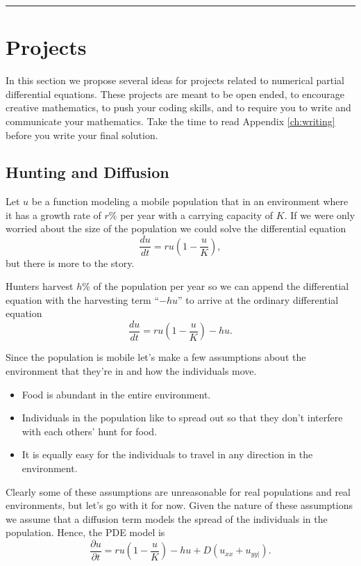 \documentclass[
]{book}
\theoremstyle{definition}
\theoremstyle{definition}
\theoremstyle{definition}
\theoremstyle{remark}
\begin{document}
\begin{center}\rule{0.5\linewidth}{0.5pt}\end{center}

\hypertarget{projects-4}{%
\section{Projects}\label{projects-4}}

In this section we propose several ideas for projects related to
numerical partial differential equations. These projects are meant to be
open ended, to encourage creative mathematics, to push your coding
skills, and to require you to write and communicate your mathematics.
Take the time to read Appendix \ref{ch:writing} before you write your final solution.

\hypertarget{hunting-and-diffusion}{%
\subsection{Hunting and Diffusion}\label{hunting-and-diffusion}}

Let \(u\) be a function modeling a mobile population that in an
environment where it has a growth rate of \(r\%\) per year with a carrying
capacity of \(K\). If we were only worried about the size of the
population we could solve the differential equation
\[\frac{du}{dt} = ru \left( 1-\frac{u}{K} \right),\] but there is more
to the story.

Hunters harvest \(h\)\% of the population per year so we can append the
differential equation with the harvesting term ``\(-h u\)'' to arrive at the
ordinary differential equation
\[\frac{du}{dt} = ru \left( 1-\frac{u}{K} \right) - hu.\]

Since the population is mobile let's make a few assumptions about the
environment that they're in and how the individuals move.

\begin{itemize}
\item
  Food is abundant in the entire environment.
\item
  Individuals in the population like to spread out so that they don't
  interfere with each others' hunt for food.
\item
  It is equally easy for the individuals to travel in any direction in
  the environment.
\end{itemize}

Clearly some of these assumptions are unreasonable for real populations
and real environments, but let's go with it for now. Given the nature of
these assumptions we assume that a diffusion term models the spread of
the individuals in the population. Hence, the PDE model is
\[\frac{\partial u}{\partial t} = ru\left( 1-\frac{u}{K} \right) - hu + D \left( u_{xx} + u_{yy|} \right).\]
\end{document}
